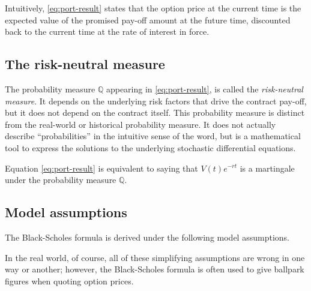 \documentclass[12pt]{article}
\newcommand{\PQ}{\mathbb{Q}}
\begin{document}
Intuitively, \eqref{eq:port-result} states that
the option price at the current time is the expected value
of the promised pay-off amount at the future time,
discounted back to the current time at the rate of interest in force.

\subsection{The risk-neutral measure}

The probability measure $\PQ$ appearing in \eqref{eq:port-result},
is called the \emph{risk-neutral measure}.
It depends on the underlying risk factors that drive the contract pay-off,
but it does not depend on the contract itself.
This probability measure is distinct from the real-world or historical 
probability measure.
It does not actually describe ``probabilities'' in the intuitive sense
of the word, but is a mathematical tool to express the solutions
to the underlying stochastic differential equations.

Equation \eqref{eq:port-result} is equivalent to
saying that $V(t) e^{-rt}$ is a martingale under the probability
measure $\PQ$.




\subsection{Model assumptions}
The Black-Scholes formula is derived under the following
model assumptions.

In the real world, of course, all of these simplifying assumptions
are wrong in one way or another; however,
the Black-Scholes formula is often used
to give ballpark figures when quoting option prices.
\end{document}
